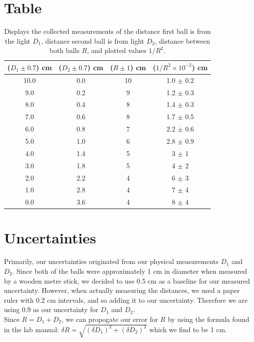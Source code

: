 \documentclass[12pt]{article}
\begin{document}
\section{Table}
\begin{table}[h]
\caption{Displays the collected measurements of the 
        distance first ball is from the light $D_1$, distance second ball is from light $D_2$,
        distance between both balls $R$, and plotted values $1/R^2$.}
\label{aggiungi}\centering
\begin{tabular}{cccc}
\toprule
    ($D_1 \pm 0.7$) cm & ($D_2 \pm 0.7$) cm & ($R\pm 1$) cm & ($1/R^2 \times 10^{-2}$) cm\\
    \midrule
    10.0& 0.0 & 10 & 1.0 $\pm$ 0.2\\
    9.0 & 0.2 & 9 & 1.2 $\pm$ 0.3\\
    8.0 & 0.4 & 8 & 1.4 $\pm$ 0.3\\
    7.0 & 0.6 & 8 & 1.7 $\pm$ 0.5\\
    6.0 & 0.8 & 7 & 2.2 $\pm$ 0.6\\
    5.0 & 1.0 & 6 & 2.8 $\pm$ 0.9\\
    4.0 & 1.4 & 5 & 3 $\pm$ 1\\
    3.0 & 1.8 & 5 & 4 $\pm$ 2\\
    2.0 & 2.2 & 4 & 6 $\pm$ 3\\
    1.0 & 2.8 & 4 & 7 $\pm$ 4\\
    0.0 & 3.6 & 4 & 8 $\pm$ 4\\\bottomrule
\end{tabular}
\end{table}
\pagebreak

\section{Uncertainties}
Primarily, our uncertainties originated from our physical measurements $D_1$ and $D_2$.
Since both of the balls were approximately 1 cm in diameter when measured by a wooden metre stick, we decided to use 0.5 cm as a baseline
for our measured uncertainty. However, when actually measuring the distances, we used a paper ruler with 0.2 cm intervals, and so adding it to our uncertainty.
Therefore we are using 0.9 as our uncertainty for $D_1$ and $D_2$. \\

\noindent Since $R = D_1 + D_2$, we can propogate our error for $R$ by using the formula found in the lab manual:
$\delta R = \sqrt{(\delta D_1)^2 + (\delta D_2)^2}$ which we find to be 1 cm.\\
\end{document}
